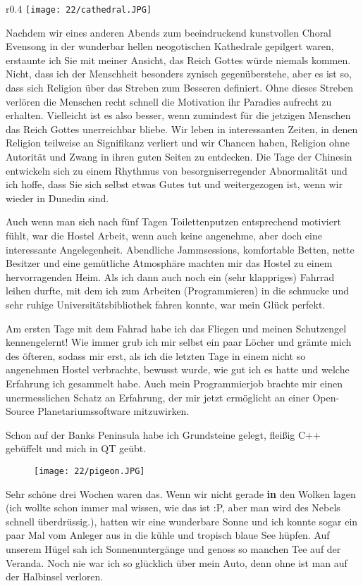 \begin{wrapfigure}[21]{r}{0.4\textwidth}
  \centering
  \texttt{[image: 22/cathedral.JPG]}
\end{wrapfigure}
Nachdem wir eines anderen Abends zum beeindruckend kunstvollen Choral
Evensong in der wunderbar hellen neogotischen Kathedrale gepilgert
waren, erstaunte ich Sie mit meiner Ansicht, das Reich Gottes würde
niemals kommen. Nicht, dass ich der Menschheit besonders zynisch
gegenüberstehe, aber es ist so, dass sich Religion über das Streben
zum Besseren definiert. Ohne dieses Streben verlören die Menschen
recht schnell die Motivation ihr Paradies aufrecht zu
erhalten. Vielleicht ist es also besser, wenn zumindest für die
jetzigen Menschen das Reich Gottes unerreichbar bliebe. Wir leben in
interessanten Zeiten, in denen Religion teilweise an Signifikanz
verliert und wir Chancen haben, Religion ohne Autorität und Zwang in
ihren guten Seiten zu entdecken. Die Tage der Chinesin entwickeln sich
zu einem Rhythmus von besorgniserregender Abnormalität und ich hoffe,
dass Sie sich selbst etwas Gutes tut und weitergezogen ist, wenn wir
wieder in Dunedin sind.

Auch wenn man sich nach fünf Tagen Toilettenputzen entsprechend
motiviert fühlt, war die Hostel Arbeit, wenn auch keine angenehme, aber
doch eine interessante Angelegenheit. Abendliche Jammsessions,
komfortable Betten, nette Besitzer und eine gemütliche Atmosphäre
machten mir das Hostel zu einem hervorragenden Heim. Als ich dann auch
noch ein (sehr klappriges) Fahrrad leihen durfte, mit dem ich zum
Arbeiten (Programmieren) in die schmucke und sehr ruhige
Universitätsbibliothek fahren konnte, war mein Glück perfekt.

Am ersten Tage mit dem Fahrad habe ich das Fliegen und meinen
Schutzengel kennengelernt! Wie immer grub ich mir selbst ein paar
Löcher und grämte mich des öfteren, sodass mir erst, als ich die
letzten Tage in einem nicht so angenehmen Hostel verbrachte, bewusst
wurde, wie gut ich es hatte und welche Erfahrung ich gesammelt
habe. Auch mein Programmierjob brachte mir einen unermesslichen Schatz
an Erfahrung, der mir jetzt ermöglicht an einer Open-Source
Planetariumssoftware mitzuwirken.

Schon auf der Banks Peninsula habe ich Grundsteine gelegt, fleißig C++
gebüffelt und mich in QT geübt.

\begin{figure}[h]
  \centering
  \texttt{[image: 22/pigeon.JPG]}
\end{figure}
Sehr schöne drei Wochen waren das. Wenn wir nicht gerade
\textbf{\textbf{in}} den Wolken lagen (ich wollte schon immer mal
wissen, wie das ist :P, aber man wird des Nebels schnell überdrüssig.),
hatten wir eine wunderbare Sonne und ich konnte sogar ein paar Mal vom
Anleger aus in die kühle und tropisch blaue See hüpfen. Auf unserem
Hügel sah ich Sonnenuntergänge und genoss so manchen Tee auf der
Veranda. Noch nie war ich so glücklich über mein Auto, denn ohne ist man
auf der Halbinsel verloren.

